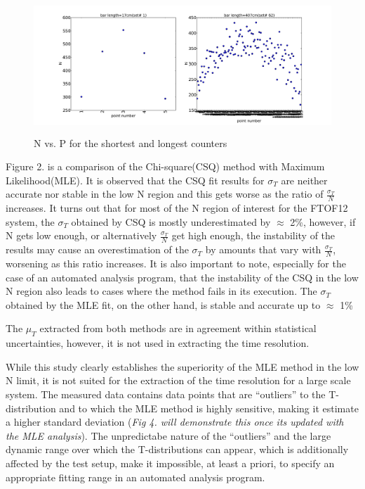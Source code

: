 \documentclass[12pt]{article}
\begin{document}
\begin{figure}[ht]
	\includegraphics[height=2in,width=5in]{bar_stats_write-up_N-vs-p.pdf}
	\caption{N vs. P for the shortest and longest counters}
	\label{fig1}
\end{figure}

Figure 2. is a comparison of the Chi-square(CSQ) method with Maximum Likelihood(MLE). It is observed that the CSQ fit results for $\sigma_{T}$ are neither accurate nor stable in the low N region and this gets worse as the ratio of $\frac{\sigma_{T}}{N}$ increases. It turns out that for most of the N region of interest for the FTOF12 system, the $\sigma_{T}$ obtained by CSQ is mostly underestimated by $\approx$ 2\%, however, if N gets low enough, or alternatively $\frac{\sigma_{T}}{N}$ get high enough, the instability of the results may cause an overestimation of the $\sigma_{T}$ by amounts that vary with $\frac{\sigma_{T}}{N}$, worsening as this ratio increases. It is also important to note, especially for the case of an automated analysis program, that the instability of the CSQ in the low N region also leads to cases where the method fails in its execution. The $\sigma_{T}$ obtained by the MLE fit, on the other hand, is stable and accurate up to $\approx$ 1\%

The $\mu_{T}$ extracted from both methods are in agreement within statistical uncertainties, however, it is not used in extracting the time resolution.

While this study clearly establishes the superiority of the MLE method in the low N limit, it is not suited for the extraction of the time resolution for a large scale system. The measured data contains data points that are ``outliers'' to the T-distribution and to which the MLE method is highly sensitive, making it estimate a higher standard deviation (\textit{Fig 4. will demonstrate this once its updated with the MLE analysis}). The unpredictabe nature of the ``outliers'' and the large dynamic range over which the T-distributions can appear, which is additionally affected by the test setup, make it impossible, at least a priori, to specify an appropriate fitting range in an automated analysis program.
\end{document}
